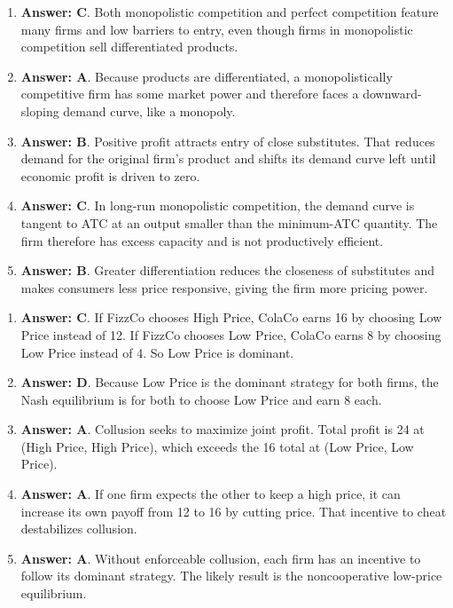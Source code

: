 \documentclass[10pt]{article}
\begin{document}
\begin{enumerate}[resume*=aps, leftmargin=*, itemsep=0.6em, topsep=0.2em, parsep=0pt]
\item \textbf{Answer: C}. Both monopolistic competition and perfect competition feature many firms and low barriers to entry, even though firms in monopolistic competition sell differentiated products.
\item \textbf{Answer: A}. Because products are differentiated, a monopolistically competitive firm has some market power and therefore faces a downward-sloping demand curve, like a monopoly.
\item \textbf{Answer: B}. Positive profit attracts entry of close substitutes. That reduces demand for the original firm's product and shifts its demand curve left until economic profit is driven to zero.
\item \textbf{Answer: C}. In long-run monopolistic competition, the demand curve is tangent to ATC at an output smaller than the minimum-ATC quantity. The firm therefore has excess capacity and is not productively efficient.
\item \textbf{Answer: B}. Greater differentiation reduces the closeness of substitutes and makes consumers less price responsive, giving the firm more pricing power.
\end{enumerate}
\begin{enumerate}[resume*=aps, leftmargin=*, itemsep=0.6em, topsep=0.2em, parsep=0pt]
\item \textbf{Answer: C}. If FizzCo chooses High Price, ColaCo earns 16 by choosing Low Price instead of 12. If FizzCo chooses Low Price, ColaCo earns 8 by choosing Low Price instead of 4. So Low Price is dominant.
\item \textbf{Answer: D}. Because Low Price is the dominant strategy for both firms, the Nash equilibrium is for both to choose Low Price and earn 8 each.
\item \textbf{Answer: A}. Collusion seeks to maximize joint profit. Total profit is 24 at (High Price, High Price), which exceeds the 16 total at (Low Price, Low Price).
\item \textbf{Answer: A}. If one firm expects the other to keep a high price, it can increase its own payoff from 12 to 16 by cutting price. That incentive to cheat destabilizes collusion.
\item \textbf{Answer: A}. Without enforceable collusion, each firm has an incentive to follow its dominant strategy. The likely result is the noncooperative low-price equilibrium.
\end{enumerate}
\end{document}
